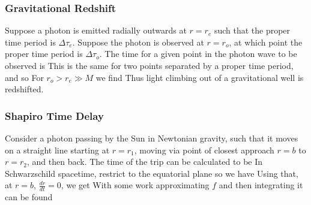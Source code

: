 \documentclass{article}
\begin{document}
\subsubsection{Gravitational Redshift}
Suppose a photon is emitted radially outwards at $r=r_e$ such that the proper time period is $\Delta \tau_e$. Suppose the photon is observed at $r=r_o$, at which point the proper time period is $\Delta \tau_o$. The time for a given point in the photon wave to be observed is 
This is the same for two points separated by a proper time period, and so 
For $r_o > r_e \gg M$ we find 
Thus light climbing out of a gravitational well is redshifted. 
\subsubsection{Shapiro Time Delay}
Consider a photon passing by the Sun in Newtonian gravity, such that it moves on a straight line starting at $r=r_1$, moving via point of closest approach $r=b$ to $r=r_2$, and then back. The time of the trip can be calculated to be 
In Schwarzschild spacetime, restrict to the equatorial plane so we have 
Using that, at $r=b$, $\frac{dr}{dt} = 0$, we get 
With some work approximating $f$ and then integrating it can be found 
\end{document}
